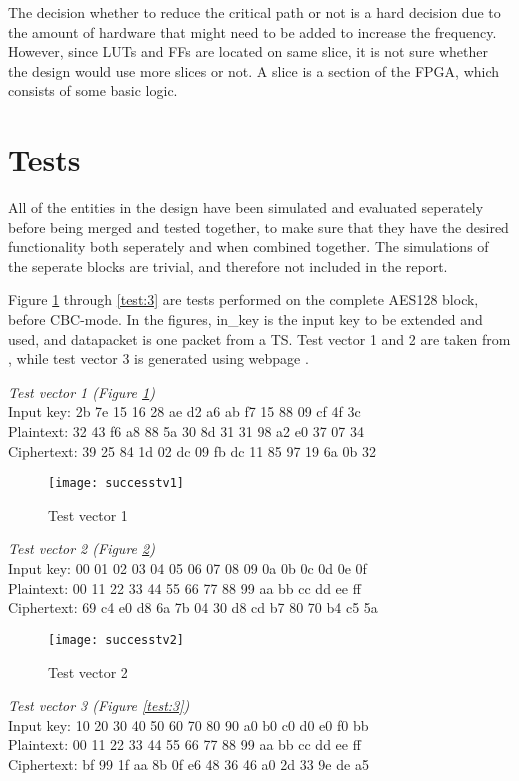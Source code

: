 The decision whether to reduce the critical path or not is a hard 
decision due to the amount of hardware that might need to be added to
increase the frequency. However, since LUTs and FFs are located on 
same slice, it is not sure whether the design would use more slices or 
not. A slice is a section of the FPGA, which consists of some basic 
logic.

\section{Tests}
All of the entities in the design have been simulated and evaluated 
seperately before being merged and tested together, to make sure that 
they have the desired functionality both seperately and when combined 
together. The simulations of the seperate blocks are trivial, and 
therefore not included in the report. 

Figure \ref{test:1} through \ref{test:3} are tests performed on the 
complete AES128 block, before CBC-mode. In the figures, in\_key is 
the input key to be extended and used, and datapacket is one packet 
from a TS. Test vector 1 and 2 are taken from \citet{AES:2001}, while 
test vector 3 is generated using webpage \citep{Generator}.

\emph{Test vector 1 (Figure \ref{test:1})}\\
Input key: 2b 7e 15 16 28 ae d2 a6 ab f7 15 88 09 cf 4f 3c\\
Plaintext: 32 43 f6 a8 88 5a 30 8d 31 31 98 a2 e0 37 07 34\\
Ciphertext: 39 25 84 1d 02 dc 09 fb dc 11 85 97 19 6a 0b 32

\begin{figure}
  \texttt{[image: successtv1]}
  \caption{Test vector 1}
  \label{test:1}
\end{figure}

\emph{Test vector 2 (Figure \ref{test:2})}\\
Input key: 00 01 02 03 04 05 06 07 08 09 0a 0b 0c 0d 0e 0f\\
Plaintext: 00 11 22 33 44 55 66 77 88 99 aa bb cc dd ee ff\\
Ciphertext: 69 c4 e0 d8 6a 7b 04 30 d8 cd b7 80 70 b4 c5 5a

\begin{figure}
  \texttt{[image: successtv2]}
  \caption{Test vector 2}
  \label{test:2}
\end{figure}

\emph{Test vector 3 (Figure \ref{test:3})} \\
Input key: 10 20 30 40 50 60 70 80 90 a0 b0 c0 d0 e0 f0 bb\\
Plaintext: 00 11 22 33 44 55 66 77 88 99 aa bb cc dd ee ff\\
Ciphertext: bf 99 1f aa 8b 0f e6 48 36 46 a0 2d 33 9e de a5

